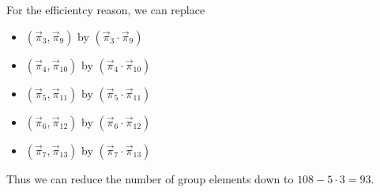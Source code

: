 For the efficientcy reason, we can replace
\begin{itemize}
\item $(\vec{\pi}_3,\vec{\pi}_9)$ by $(\vec{\pi}_3 \cdot \vec{\pi}_9)$
\item $(\vec{\pi}_4,\vec{\pi}_{10})$ by $(\vec{\pi}_4 \cdot\vec{\pi}_{10})$
\item $(\vec{\pi}_5,\vec{\pi}_{11})$ by $(\vec{\pi}_5 \cdot\vec{\pi}_{11})$
\item $(\vec{\pi}_6,\vec{\pi}_{12})$ by $(\vec{\pi}_6 \cdot\vec{\pi}_{12})$
\item $(\vec{\pi}_7,\vec{\pi}_{13})$ by $(\vec{\pi}_7 \cdot\vec{\pi}_{13})$
\end{itemize}

Thus we can reduce the number of group elements down to $108-5 \cdot 3 = 93$.


